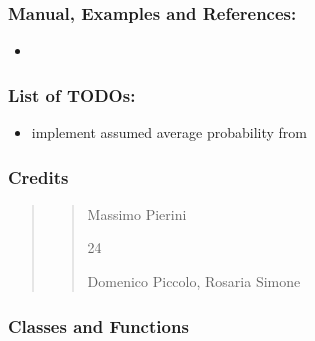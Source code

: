 \documentclass[letterpaper,10pt,english]{sphinxmanual}
\begin{document}
\subsubsection{Manual, Examples and References:}
\label{\detokenize{cubmods:id83}}\begin{itemize}
\item {} 
\sphinxAtStartPar
{}

\end{itemize}


\subsubsection{List of TODOs:}
\label{\detokenize{cubmods:id84}}\begin{itemize}
\item {} 
\sphinxAtStartPar
implement assumed average probability from 

\end{itemize}


\subsubsection{Credits}
\label{\detokenize{cubmods:id85}}\begin{quote}
\begin{quote}\begin{description}
\sphinxAtStartPar
Massimo Pierini

\sphinxhyphen{}24

\sphinxAtStartPar
Domenico Piccolo, Rosaria Simone

\sphinxAtStartPar
{}

\end{description}\end{quote}
\end{quote}


\subsubsection{Classes and Functions}
\label{\detokenize{cubmods:id86}}
\end{document}
